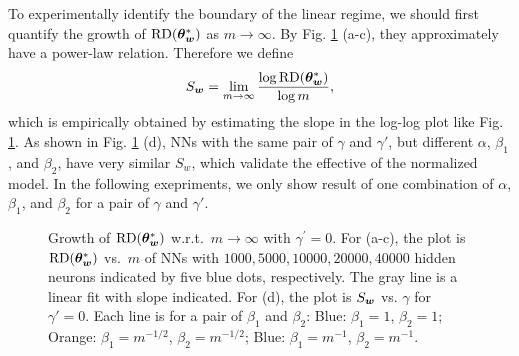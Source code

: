 \documentclass{article}
\begin{document}
To experimentally identify the boundary of the linear regime, we should first quantify the growth of $\mathrm{RD}(\bm{\theta}^*_{\bm{w}})$ as $m\to\infty$. By Fig. \ref{fig:diffbeta} (a-c), they approximately have a power-law relation. Therefore we define 
\begin{equation}
    S_{\bm{w}}=\lim_{m\to\infty}\frac{\log \mathrm{RD}(\bm{\theta}^*_{\bm{w}})}{\log m},
\end{equation}
which is empirically obtained by estimating the slope in the log-log plot like Fig. \ref{fig:diffbeta}. As shown in Fig. \ref{fig:diffbeta} (d), NNs with the same pair of $\gamma$ and $\gamma'$, but different $\alpha$, $\beta_1$, and $\beta_2$, have very similar $S_{w}$, which validate the effective of the normalized model. In the following exepriments, we only show result of one combination of $\alpha$, $\beta_1$, and $\beta_2$ for a pair of $\gamma$ and $\gamma'$.
\begin{figure}
    \centering
    \caption{Growth of $\mathrm{RD}(\bm{\theta}^*_{\bm{w}})$ w.r.t.\ $m\to\infty$ with $\gamma^{\prime}=0$. For (a-c), the plot is $\mathrm{RD}(\bm{\theta}^*_{\bm{w}})$ vs.\ $m$ of NNs with $1000,5000,10000,20000,40000$ hidden neurons indicated by five blue dots, respectively. The gray line is a linear fit with slope indicated. For (d), the plot is $S_{\bm{w}}$ vs. $\gamma$ for $\gamma'=0$. Each line is for a pair of $\beta_1$ and $\beta_2$: Blue: $\beta_1=1$, $\beta_2=1$; Orange: $\beta_1=m^{-1/2}$, $\beta_2=m^{-1/2}$; Blue: $\beta_1=m^{-1}$, $\beta_2=m^{-1}$.}
    \label{fig:diffbeta}
\end{figure}
\end{document}
